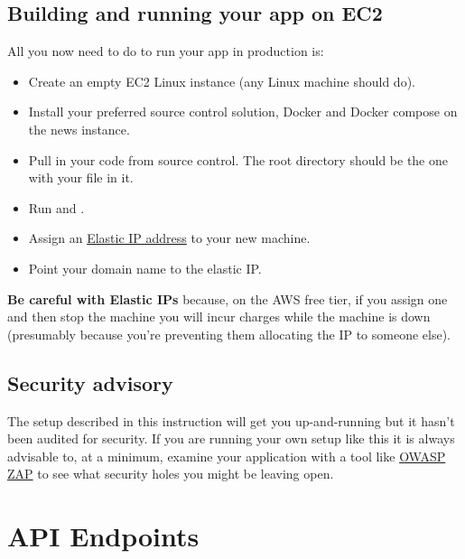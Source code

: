 \documentclass[letterpaper,10pt,english]{sphinxmanual}
\begin{document}
\section{Building and running your app on EC2}
\label{docker_ec2:building-and-running-your-app-on-ec2}
All you now need to do to run your app in production is:
\begin{itemize}
\item {} 
Create an empty EC2 Linux instance (any Linux machine should do).

\item {} 
Install your preferred source control solution, Docker and Docker compose on the news instance.

\item {} 
Pull in your code from source control. The root directory should be the one with your  file in it.

\item {} 
Run  and .

\item {} 
Assign an \href{https://aws.amazon.com/articles/1346}{Elastic IP address} to your new machine.

\end{itemize}
\begin{itemize}
\item {} 
Point your domain name to the elastic IP.

\end{itemize}

\textbf{Be careful with Elastic IPs} because, on the AWS free tier, if you assign one and then stop the machine you will incur charges while the machine is down (presumably because you're preventing them allocating the IP to someone else).


\section{Security advisory}
\label{docker_ec2:security-advisory}
The setup described in this instruction will get you up-and-running but it hasn't been audited for security. If you are running your own setup like this it is always advisable to, at a minimum, examine your application with a tool like \href{https://www.owasp.org/index.php/OWASP\_Zed\_Attack\_Proxy\_Project}{OWASP ZAP} to see what security holes you might be leaving open.


\chapter{API Endpoints}
\label{api::doc}\label{api:api-endpoints}\label{api:owasp-zap}
\end{document}
